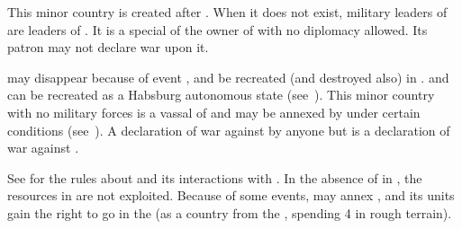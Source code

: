  \hfill {}
\bparag This minor country is created after . When it does not exist, military leaders of
 are leaders of .
\bparag[] [BLP] It is a special \VASSAL of the owner of
\provinceHongrie with no diplomacy allowed. Its patron may not declare
war upon it.

 \hfill {}
\bparag \paysBoheme may disappear because of event , and be recreated (and destroyed also) in
.
\aparag {} and  can be recreated as a Habsburg
autonomous state (see~).
 This minor country with no military
forces is a vassal of \POL and may be annexed by \POL under certain
conditions (see~). A declaration of war
against  by anyone but \POL is a declaration of war
against \POL.


\label{chSpecific:Persia}
\bparag See  for the rules about 
and its interactions with . In the absence of \TP in
, the resources in  are not exploited.
\bparag Because of some events,  may annex
, and its units gain the right to go in the
\ROTW (as a country from the \ROTW, spending 4 \MP in rough terrain).

